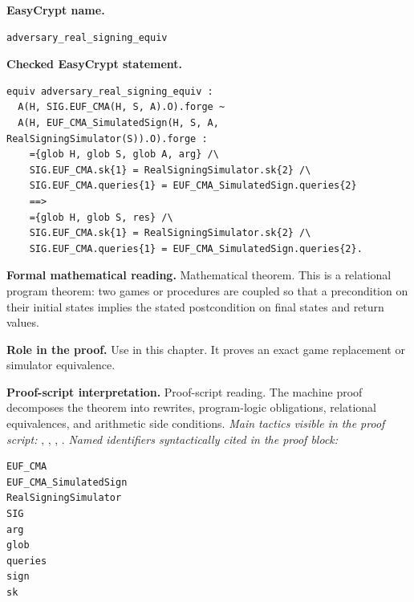 \begin{formaltheorem}
\noindent\textbf{EasyCrypt name.}
\begin{lstlisting}[language=EasyCrypt,basicstyle=\ttfamily\scriptsize]
adversary_real_signing_equiv
\end{lstlisting}
\noindent\textbf{Checked EasyCrypt statement.}
\begin{lstlisting}[language=EasyCrypt,basicstyle=\ttfamily\scriptsize]
equiv adversary_real_signing_equiv :
  A(H, SIG.EUF_CMA(H, S, A).O).forge ~
  A(H, EUF_CMA_SimulatedSign(H, S, A, RealSigningSimulator(S)).O).forge :
    ={glob H, glob S, glob A, arg} /\
    SIG.EUF_CMA.sk{1} = RealSigningSimulator.sk{2} /\
    SIG.EUF_CMA.queries{1} = EUF_CMA_SimulatedSign.queries{2}
    ==>
    ={glob H, glob S, res} /\
    SIG.EUF_CMA.sk{1} = RealSigningSimulator.sk{2} /\
    SIG.EUF_CMA.queries{1} = EUF_CMA_SimulatedSign.queries{2}.
\end{lstlisting}
\noindent\textbf{Formal mathematical reading.}
Mathematical theorem. This is a relational program theorem: two games or procedures are coupled so that a precondition on their initial states implies the stated postcondition on final states and return values.

\noindent\textbf{Role in the proof.}
Use in this chapter. It proves an exact game replacement or simulator equivalence.

\noindent\textbf{Proof-script interpretation.}
Proof-script reading. The machine proof decomposes the theorem into rewrites, program-logic obligations, relational equivalences, and arithmetic side conditions.
\emph{Main tactics visible in the proof script:} \ec{proc}, \ec{inline}, \ec{wp}, .
\emph{Named identifiers syntactically cited in the proof block:}
\begin{lstlisting}[language=EasyCrypt,basicstyle=\ttfamily\scriptsize]
EUF_CMA
EUF_CMA_SimulatedSign
RealSigningSimulator
SIG
arg
glob
queries
sign
sk
\end{lstlisting}

\end{formaltheorem}

